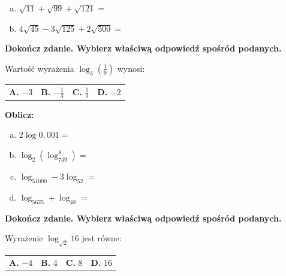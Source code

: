 \documentclass[12pt,a4paper]{article}
\theoremstyle{break}
\begin{document}
	\begin{enumerate}[a)]
		\item $\sqrt{11}+\sqrt{99}+\sqrt{121}=$
		\item $4\sqrt{45}-3\sqrt{125}+2\sqrt{500}=$
	\end{enumerate}
	
	
	\begin{zad}[0-1]
		\textbf{Dokończ zdanie. Wybierz właściwą odpowiedź spośród podanych.}
	\end{zad} 
	
	Wartość wyrażenia $\log_3(\frac{1}{9})$ wynosi:
	
	\vspace{0.5cm}
	\begin{tabular}{p{3.5cm} p{3.5cm} p{3.5cm} p{3.5cm}}
		\textbf{A. }$-3$&
		\textbf{B. }$-\frac{1}{3}$&
		\textbf{C. }$\frac{1}{3}$&
		\textbf{D. }$-2$\\
	\end{tabular}
	
	
	\begin{zad}[0-4]
		\textbf{Oblicz:}
	\end{zad} 
	
	\begin{enumerate}[a)]
		\item $2\log0,001=$
		\item $\log_2(\log_749^8)=$
		\item $\log_51000-3\log_52=$
		\item $\log_5625+\log_48=$
	\end{enumerate}
	
	
	\begin{zad}[0-1]
		\textbf{Dokończ zdanie. Wybierz właściwą odpowiedź spośród podanych.}
	\end{zad} 
	
	Wyrażenie $\log_{\sqrt{2}}16$ jest równe:
	
	\vspace{0.5cm}
	\begin{tabular}{p{3.5cm} p{3.5cm} p{3.5cm} p{3.5cm}}
		\textbf{A. }$-4$&
		\textbf{B. }$4$&
		\textbf{C. }$8$&
		\textbf{D. }$16$\\
	\end{tabular}

	\newpage
\end{document}
